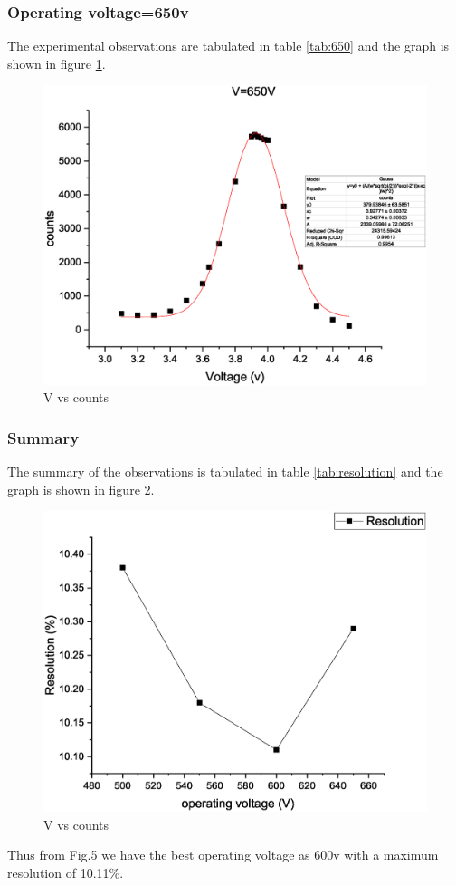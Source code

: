 		\subsubsection{Operating voltage=650v}
			The experimental observations are tabulated in table \ref{tab:650} and the graph is shown in figure \ref{graph:650}.
			
			\begin{figure}[H]
				\centering
				\includegraphics[width=0.9\columnwidth]{images/Graph4.eps}
				\caption{V vs counts}
				\label{graph:650}
			\end{figure}
		\subsubsection{\label{sec:level1}Summary}
			The summary of the observations is tabulated in table \ref{tab:resolution} and the graph is shown in figure \ref{graph:summary}.
			
			\begin{figure}[H]
				\centering
				\includegraphics[width=0.9\columnwidth]{images/Graph5.eps}
				\caption{V vs counts}
				\label{graph:summary}
			\end{figure}
			Thus from Fig.5 we have the best operating voltage as 600v with a maximum resolution of 10.11\%.
